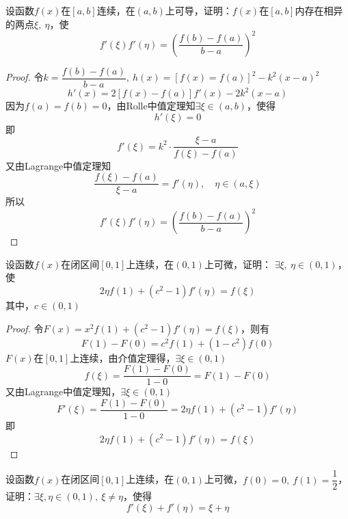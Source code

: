 \begin{proposition}
    
    设函数$f(x)$在$[a,b]$连续，在$(a,b)$上可导，证明：$f(x)$在$[a,b]$内存在相异的两点$\xi,\ \eta$，使
    $$f'(\xi)f'(\eta) = \left( \dfrac{f(b) - f(a)}{b - a} \right)^2$$

\end{proposition}

\begin{proof}

    令$k = \dfrac{f(b) - f(a)}{b - a},\ h(x) = [f(x) = f(a)]^2 - k^2(x - a)^2$
    $$h'(x) = 2[f(x) - f(a)]f'(x) - 2k^2 (x - a)$$
    因为$f(a) = f(b) = 0$，由\textup{Rolle}中值定理知$\exists \xi \in (a,b)$，使得
    $$h'(\xi) = 0$$
    即
    $$f'(\xi) = k^2 \cdot \dfrac{\xi - a}{f(\xi) - f(a)}$$
    又由\textup{Lagrange}中值定理知
    $$\dfrac{f(\xi) - f(a)}{\xi - a} = f'(\eta), \quad \eta \in (a,\xi)$$
    所以
    $$f'(\xi)f'(\eta) = \left( \dfrac{f(b) - f(a)}{b - a} \right)^2$$

\end{proof}

\begin{proposition}
    
    设函数$f(x)$在闭区间$[0,1]$上连续，在$(0,1)$上可微，证明：
    $\exists \xi,\  \eta \in (0,1)$，使
    $$2\eta f(1) + (c^2 - 1)f'(\eta) = f(\xi)$$
    其中，$c \in (0,1)$
    
\end{proposition}

\begin{proof}

    令$F(x) = x^2f(1) + (c^2 - 1)f'(\eta) = f(\xi)$，则有
    $$F(1) - F(0) = c^2f(1) + (1 - c^2)f(0)$$
    $F(x)$在$[0,1]$上连续，由介值定理得，$\exists \xi \in (0,1)$
    $$f(\xi) = \dfrac{F(1) - F(0)}{1 - 0} = F(1) - F(0)$$
    又由\textup{Lagrange}中值定理知，$\exists \xi \in (0,1)$
    $$F'(\xi) = \dfrac{F(1) - F(0)}{1 - 0} = 2\eta f(1) + (c^2 - 1)f'(\eta) $$
    即
    $$2\eta f(1) + (c^2 - 1)f'(\eta) = f(\xi)$$

\end{proof}

\begin{proposition}

    设函数$f(x)$在闭区间$[0,1]$上连续，在$(0,1)$上可微，$f(0) = 0,\ f(1) = \dfrac{1}{2}$，证明：$\exists \xi,\eta \in (0,1),\ \xi \neq \eta$，使得
    $$f'(\xi) + f'(\eta) = \xi + \eta$$

\end{proposition}

